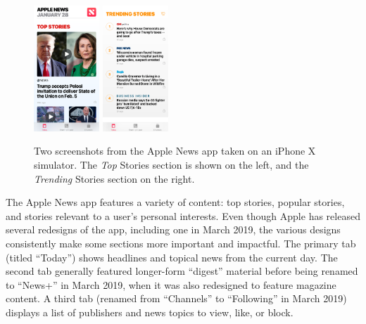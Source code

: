\begin{figure}[!t] 
    \begin{center}
        
        \includegraphics[width=0.22\textwidth]{top.png}    		\includegraphics[width=0.22\textwidth]{trending.png}
    \end{center}
    \caption{Two screenshots from the Apple News app taken on an iPhone X simulator. The \textit{Top} Stories section is shown on the left, and the \textit{Trending} Stories section on the right.}
    \label{fig-screenshots}
\end{figure}


The Apple News app features a variety of content: top stories, popular stories, and stories relevant to a user's personal interests. Even though Apple has released several redesigns of the app, including one in March 2019, the various designs consistently make some sections more important and impactful. The primary tab (titled ``Today'') shows headlines and topical news from the current day. The second tab generally featured longer-form ``digest'' material before being renamed to ``News+'' in March 2019, when it was also redesigned to feature magazine content. A third tab (renamed from ``Channels'' to ``Following'' in March 2019) displays a list of publishers and news topics to view, like, or block. %

